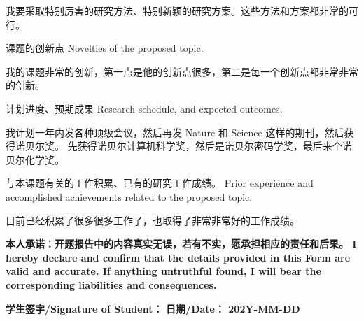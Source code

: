 \documentclass[a4paper,zihao=-4,AutoFakeBold]{ctexart}
\begin{document}
\begin{content}
    我要采取特别厉害的研究方法、特别新颖的研究方案。这些方法和方案都非常的可行。
\end{content}


\begin{requirement}
    课题的创新点 Novelties of the proposed topic.
\end{requirement}

\begin{content}
    我的课题非常的创新，第一点是他的创新点很多，第二是每一个创新点都非常非常的创新。
\end{content}


\begin{requirement}
    计划进度、预期成果 Research schedule, and expected outcomes.
\end{requirement}

\begin{content}
    我计划一年内发各种顶级会议，然后再发 Nature 和 Science 这样的期刊，然后获得诺贝尔奖。
    先获得诺贝尔计算机科学奖，然后是诺贝尔密码学奖，最后来个诺贝尔化学奖。
\end{content}


\begin{requirement}
    与本课题有关的工作积累、已有的研究工作成绩。
    Prior experience and accomplished achievements related to the proposed topic.
\end{requirement}

\begin{content}
    目前已经积累了很多很多工作了，也取得了非常非常好的工作成绩。
\end{content}



\vspace{\baselineskip}
\noindent
{\bfseries\fangsong 
本人承诺：开题报告中的内容真实无误，若有不实，愿承担相应的责任和后果。
I hereby declare and confirm that the details 
provided in this Form are valid and accurate. 
If anything untruthful found, 
I will bear the corresponding liabilities and consequences.}

\vspace{\baselineskip}

\noindent
\textbf{学生签字/Signature of Student：} 
\hfill              
\textbf{日期/Date： 202Y-MM-DD}
\end{document}
